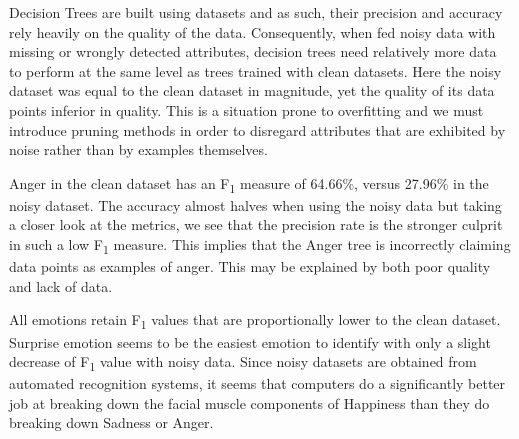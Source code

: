 Decision Trees are built using datasets and as such, their precision and accuracy rely heavily on the quality of the data.
Consequently, when fed noisy data with missing or wrongly detected attributes, decision trees need relatively more data to
perform at the same level as trees trained with clean datasets. Here the noisy dataset was equal to the clean dataset in magnitude, yet the quality of its data points
inferior in quality. This is a situation prone to overfitting and we must introduce pruning methods in order to disregard attributes
that are exhibited by noise rather than by examples themselves.

Anger in the clean dataset has an F\textsubscript{1} measure of 64.66\%, versus 27.96\% in the noisy dataset.
The accuracy almost halves when using the noisy data but taking a closer look at the metrics, we see that the precision
rate is the stronger culprit in such a low F\textsubscript{1} measure. This implies that the Anger tree is incorrectly claiming
data points as examples of anger. This may be explained by both poor quality and lack of data.

\newpage
All emotions retain F\textsubscript{1} values that are proportionally lower to the clean dataset. 
Surprise emotion seems to be the easiest emotion to identify with only a slight decrease of F\textsubscript{1} value with noisy data.
Since noisy datasets are obtained from automated recognition systems, it seems that computers do a significantly better job at
breaking down the facial muscle components of Happiness than they do breaking down Sadness or Anger. 
